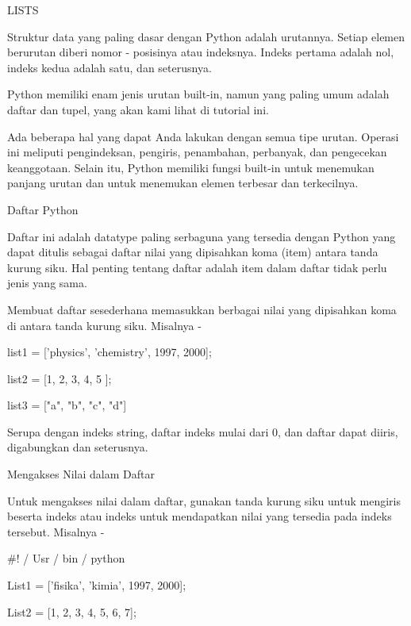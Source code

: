  
LISTS \par
Struktur data yang paling dasar dengan Python adalah urutannya. Setiap elemen berurutan diberi nomor - posisinya atau indeksnya. Indeks pertama adalah nol, indeks kedua adalah satu, dan seterusnya. \par
\vspace{12pt}
Python memiliki enam jenis urutan built-in, namun yang paling umum adalah daftar dan tupel, yang akan kami lihat di tutorial ini. \par
Ada beberapa hal yang dapat Anda lakukan dengan semua tipe urutan. Operasi ini meliputi pengindeksan, pengiris, penambahan, perbanyak, dan pengecekan keanggotaan. Selain itu, Python memiliki fungsi built-in untuk menemukan panjang urutan dan untuk menemukan elemen terbesar dan terkecilnya. \par
\vspace{12pt}
Daftar Python \par
\vspace{12pt}
Daftar ini adalah datatype paling serbaguna yang tersedia dengan Python yang dapat ditulis sebagai daftar nilai yang dipisahkan koma (item) antara tanda kurung siku. Hal penting tentang daftar adalah item dalam daftar tidak perlu jenis yang sama. \par
Membuat daftar sesederhana memasukkan berbagai nilai yang dipisahkan koma di antara tanda kurung siku. Misalnya - \par
\vspace{12pt}
list1 = ['physics', 'chemistry', 1997, 2000]; \par
list2 = [1, 2, 3, 4, 5 ]; \par
list3 = ["a", "b", "c", "d"] \par
Serupa dengan indeks string, daftar indeks mulai dari 0, dan daftar dapat diiris, digabungkan dan seterusnya. \par
Mengakses Nilai dalam Daftar \par
Untuk mengakses nilai dalam daftar, gunakan tanda kurung siku untuk mengiris beserta indeks atau indeks untuk mendapatkan nilai yang tersedia pada indeks tersebut. Misalnya - \par
\vspace{12pt}
 $  \#  $! / Usr / bin / python \par
\vspace{12pt}
List1 = ['fisika', 'kimia', 1997, 2000]; \par
List2 = [1, 2, 3, 4, 5, 6, 7]; \par
\vspace{12pt}
